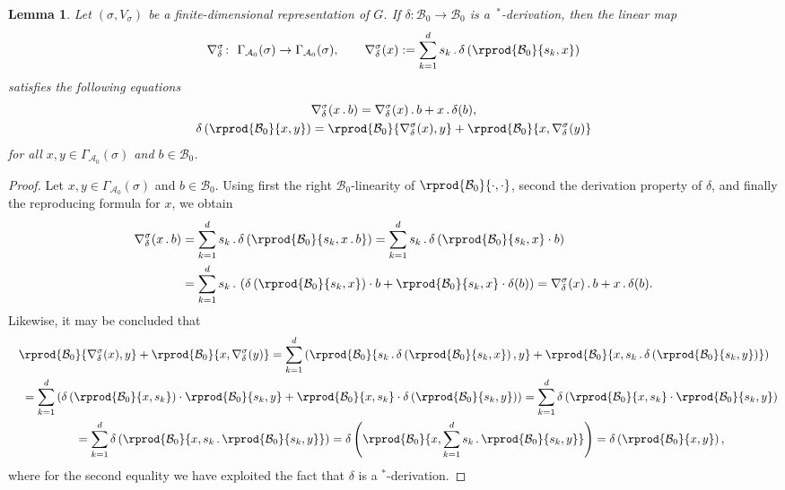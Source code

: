 \documentclass[10pt,a4paper]{amsart}
\numberwithin{equation}{section}
\newtheorem{Lemma}[Theorem]{Lemma}
\newcommand*{\Star}{$^*$\nobreakdash}
\newcommand*{\acts}{\,.\,}
\newcommand*{\alg}{\mathcal}		%
\newcommand*{\aA}{\alg{A}}			%
\newcommand*{\aB}{\alg{B}} 			%
\begin{document}
\begin{Lemma}\label{lem:conn}
	Let $(\sigma,V_\sigma)$ be a finite-dimensional representation of $G$.
	If $\delta \colon \aB_0 \to \aB_0$ is a~\Star-de\-ri\-va\-tion, then the linear map
	\begin{gather*}
			\nabla_\delta^\sigma \colon \ \Gamma_{\aA_0}(\sigma) \to \Gamma_{\aA_0}(\sigma), \qquad \nabla_\delta^\sigma(x) := \sum_{k=1}^d s_k \acts \delta \left( \rprod{\aB_0}{s_k,x} \right)
	\end{gather*}
satisfies the following equations
	\begin{gather}
		\label{eq:Leibniz}
		\nabla_\delta^\sigma(x \acts b) = \nabla_\delta^\sigma(x) \acts b + x \acts \delta(b),
		\\
		\label{eq:commutator}
		\delta \left( \rprod{\aB_0}{x,y} \right) = \rprod{\aB_0}{\nabla_\delta^\sigma(x),y} + \rprod{\aB_0}{x,\nabla_\delta^\sigma(y)}
	\end{gather}
for all $x,y \in \Gamma_{\aA_0}(\sigma)$ and $b\in \aB_0$.
\end{Lemma}
\begin{proof}
	Let $x,y \in \Gamma_{\aA_0}(\sigma)$ and $b\in \aB_0$.
	Using first the right $\aB_0$-linearity of $\rprod{\aB_0}{\cdot,\cdot}$, second the derivation property of $\delta$, and finally the reproducing formula for $x$, we obtain
	\begin{align*}
		\nabla_\delta^\sigma(x \acts b)
		&=
		\sum_{k=1}^d s_k \acts \delta \left( \rprod{\aB_0}{s_k,x \acts b} \right)
		=
		\sum_{k=1}^d s_k \acts \delta \left( \rprod{\aB_0}{s_k,x} \cdot b \right)
		\\
		&= \sum_{k=1}^d s_k \acts \left( \delta \left( \rprod{\aB_0}{s_k,x} \right) \cdot b
		+
		\rprod{\aB_0}{s_k,x} \cdot \delta(b) \right)
		=
		\nabla_\delta^\sigma(x) \acts b + x \acts \delta(b).
	\end{align*}
	Likewise, it may be concluded that
	\begin{gather*}
		\rprod{\aB_0}{\nabla_\delta^\sigma(x),y}
		+
		\rprod{\aB_0}{x,\nabla_\delta^\sigma(y)}
		=
		\sum_{k=1}^d \left( \rprod{\aB_0}{s_k \acts \delta \left( \rprod{\aB_0}{s_k,x} \right),y}
		+
		\rprod{\aB_0}{x,s_k \acts \delta \left( \rprod{\aB_0}{s_k,y} \right)} \right)
		\\
		\quad{} =
		 \sum_{k=1}^d \left( \delta \left( \rprod{\aB_0}{x,s_k} \right) \cdot \rprod{\aB_0}{s_k,y}
		 + \rprod{\aB_0}{x,s_k} \cdot \delta \left( \rprod{\aB_0}{s_k,y} \right) \right)
		 =
		 \sum_{k=1}^d \delta \left( \rprod{\aB_0}{x,s_k} \cdot \rprod{\aB_0}{s_k,y} \right)
		 \\
		 \quad{} = \sum_{k=1}^d \delta \left( \rprod{\aB_0}{x,s_k \acts \rprod{\aB_0}{s_k,y}} \right)
		 =
		 \delta \left( \rprod{\aB_0}{x, \sum_{k=1}^d s_k \acts \rprod{\aB_0}{s_k,y}} \right)
		 =
		 \delta \left( \rprod{\aB_0}{x,y} \right),
	\end{gather*}
	where for the second equality we have exploited the fact that $\delta$ is a \Star-derivation.
\end{proof}
\end{document}
